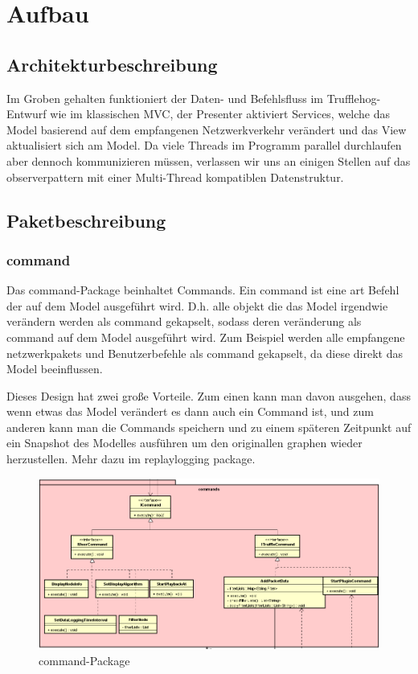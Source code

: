 \chapter{Aufbau \programname}

\section{Architekturbeschreibung}
Im Groben gehalten funktioniert der Daten- und Befehlsfluss im Trufflehog-Entwurf
wie im klassischen MVC, der Presenter aktiviert Services, welche das Model basierend
auf dem empfangenen Netzwerkverkehr verändert und das View aktualisiert sich am Model.
Da viele Threads im Programm parallel durchlaufen aber dennoch kommunizieren müssen,
verlassen wir uns an einigen Stellen auf das \gls{observerpattern} mit einer
Multi-Thread kompatiblen Datenstruktur.\newline
\newline

\section{Paketbeschreibung}

\subsection{command}

Das command-Package beinhaltet Commands. Ein command ist eine art Befehl der auf
dem Model ausgeführt wird. D.h. alle objekt die das Model irgendwie verändern
werden als command gekapselt, sodass deren veränderung als command auf dem Model
ausgeführt wird. Zum Beispiel werden alle empfangene netzwerk\glspl{paket} und
Benutzerbefehle als command gekapselt, da diese direkt das Model beeinflussen.

Dieses Design hat zwei große Vorteile. Zum einen kann man davon ausgehen, dass
wenn etwas das Model verändert es dann auch ein Command ist, und zum anderen
kann man die Commands speichern und zu einem späteren Zeitpunkt auf ein Snapshot
des Modelles ausführen um den originallen graphen wieder herzustellen. Mehr dazu
im replaylogging package.

\newline
\begin{figure}[H]
  \centering
  \includegraphics[width=\textwidth]{../diagramimages/commands.png}
  \caption{command-Package}
\end{figure}

